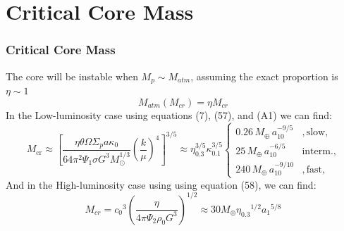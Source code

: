 \documentclass{beamer}
\begin{document}
\section{Critical Core Mass}
\begin{frame}
\frametitle{Critical Core Mass}
The core will be instable when $M_p \sim M_{atm}$, assuming the exact proportion is $\eta \sim 1$
\begin{equation}
\tag{59}
M_{atm}(M_{cr})=\eta M_{cr}
\end{equation}
In the Low-luminosity case using equations (7), (57), and (A1) we can find:
\begin{equation}
\tag{60}
M_{\text{cr}} \approx \left[ \frac{\eta \theta \Omega \Sigma_p a \kappa_0}{64 \pi^2 \Psi_1 \sigma G^3 M_\odot^{1/3}} \left( \frac{k}{\mu} \right)^{4} \right]^{3/5}
\approx \eta_{0.3}^{3/5} \kappa_{0.1}^{3/5} 
\begin{cases} 
0.26 \, M_\oplus \, a_{10}^{-9/5}&, \text{slow}, \\
25 \, M_\oplus \, a_{10}^{-6/5}&\text{interm.}, \\
240 \, M_\oplus \, a_{10}^{-9/10}&, \text{fast},
\end{cases}
\end{equation}
And in the High-luminosity case using using equation (58), we can find:
\begin{equation}
\tag{61}
M_{cr} = {c_0}^3{(\frac{\eta}{4 \pi \Psi_2 \rho_0 G^3})}^{1/2} \approx 30 M_{\oplus} {\eta_{0.3}}^{1/2} {a_1}^{5/8} 
\end{equation}
\end{frame}
\end{document}
